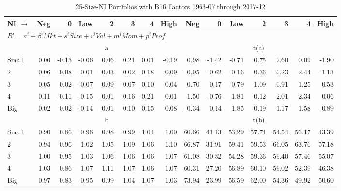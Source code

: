 
\begin{table}[!ht]
\scriptsize
\centering
\caption{25-Size-NI Portfolios with B16 Factors 1963-07 through 2017-12}
\begin{tabular}{lrrrrrrrrrrrrrr}
  \toprule
    
    NI $\rightarrow$ & Neg & 0 & Low & 2 & 3 & 4 & High & Neg & 0 & Low & 2 & 3 & 4 & High  \\ 
  \midrule
  \multicolumn{15}{l}{$R^i=a^i+\beta^iMkt+s^iSize+v^iVal+m^iMom+p^iProf$}  \\
  
     & \multicolumn{7}{c}{a} & \multicolumn{7}{c}{t(a)}   \\
     \cmidrule(r){2-8} \cmidrule(r){9-15} 
    Small  & 0.06  & -0.13  & -0.06  & 0.06  & 0.21  & 0.01  & -0.19  & 0.98  & -1.42  & -0.71  & 0.75  & 2.60  & 0.09  & -1.90   \\
    2  & -0.06  & -0.08  & -0.01  & -0.03  & -0.02  & 0.18  & -0.09  & -0.95  & -0.62  & -0.16  & -0.36  & -0.23  & 2.44  & -1.13   \\
    3  & 0.05  & 0.02  & -0.07  & 0.09  & 0.07  & 0.10  & 0.04  & 0.70  & 0.17  & -0.79  & 1.09  & 0.91  & 1.25  & 0.53   \\
    4  & 0.11  & -0.11  & -0.15  & -0.01  & 0.16  & 0.21  & 0.01  & 1.50  & -0.76  & -1.81  & -0.12  & 2.01  & 2.34  & 0.06   \\
    Big  & -0.02  & 0.02  & -0.14  & -0.01  & 0.10  & 0.15  & -0.08  & -0.34  & 0.14  & -1.85  & -0.19  & 1.17  & 1.58  & -0.89   \\
    
  
     & \multicolumn{7}{c}{b} & \multicolumn{7}{c}{t(b)}   \\
     \cmidrule(r){2-8} \cmidrule(r){9-15} 
    Small  & 0.90  & 0.86  & 0.96  & 0.98  & 0.99  & 1.04  & 1.00  & 60.66  & 41.13  & 53.29  & 57.74  & 54.54  & 56.17  & 43.39   \\
    2  & 0.94  & 0.96  & 1.02  & 1.05  & 1.09  & 1.06  & 1.10  & 66.87  & 31.91  & 59.41  & 59.53  & 66.05  & 63.76  & 57.18   \\
    3  & 1.00  & 0.95  & 1.03  & 1.06  & 1.06  & 1.06  & 1.07  & 61.08  & 30.82  & 54.28  & 59.36  & 59.40  & 57.46  & 55.07   \\
    4  & 1.03  & 0.86  & 1.07  & 1.11  & 1.07  & 1.06  & 1.07  & 60.31  & 27.20  & 56.89  & 60.10  & 59.02  & 52.39  & 46.38   \\
    Big  & 0.97  & 0.83  & 0.95  & 0.99  & 1.04  & 1.07  & 1.03  & 73.94  & 23.99  & 56.59  & 62.00  & 54.36  & 49.92  & 50.60   \\
    

\end{tabular}
\end{table}
